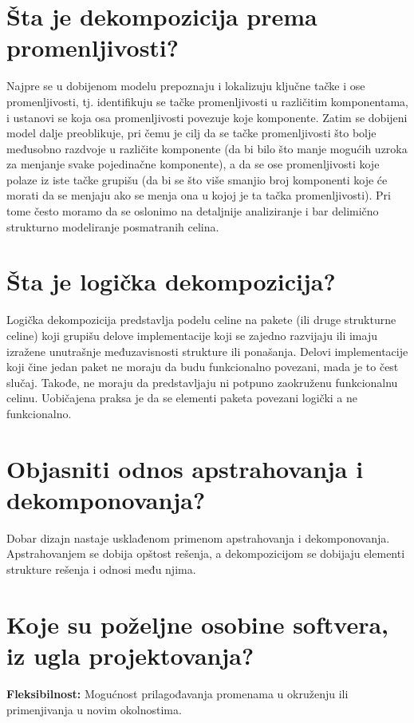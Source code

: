 \documentclass[a4paper]{article}
\begin{document}
\section{Šta je dekompozicija prema promenljivosti?}
  Najpre se u dobijenom modelu prepoznaju i lokalizuju ključne tačke i ose promenljivosti, tj. identifikuju se tačke promenljivosti u različitim komponentama, i ustanovi se koja osa promenljivosti povezuje koje komponente. Zatim se dobijeni model dalje preoblikuje, pri čemu je cilj da se tačke promenljivosti što bolje međusobno razdvoje u različite komponente (da bi bilo što manje mogućih uzroka za menjanje svake pojedinačne komponente), a da se ose promenljivosti koje polaze iz iste tačke grupišu (da bi se što više smanjio broj komponenti koje će morati da se menjaju ako se menja ona u kojoj je ta tačka promenljivosti). Pri tome često moramo da se oslonimo na detaljnije analiziranje i bar delimično strukturno modeliranje posmatranih celina.

\section{Šta je logička dekompozicija?}
Logička dekompozicija predstavlja podelu celine na pakete (ili druge strukturne celine) koji grupišu delove implementacije koji se zajedno razvijaju ili imaju izražene unutrašnje međuzavisnosti strukture ili ponašanja. 
Delovi implementacije koji čine jedan paket ne moraju da budu funkcionalno povezani, mada je to čest slučaj. Takođe, ne moraju da predstavljaju ni potpuno zaokruženu funkcionalnu celinu. Uobičajena praksa je da se elementi paketa povezani logički a ne funkcionalno.\\

\section{Objasniti odnos apstrahovanja i dekomponovanja?}
 Dobar dizajn nastaje usklađenom primenom apstrahovanja i dekomponovanja. Apstrahovanjem se dobija opštost rešenja, a dekompozicijom se dobijaju elementi strukture rešenja i odnosi među njima.

\section{Koje su poželjne osobine softvera, iz ugla projektovanja?}

  \textbf{Fleksibilnost:} Mogućnost prilagođavanja promenama u okruženju ili primenjivanja u novim okolnostima.
\end{document}
